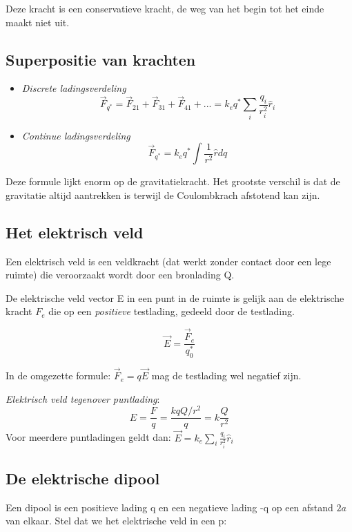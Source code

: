 \documentclass[12pt,a4paper]{article}
\begin{document}
	Deze kracht is een conservatieve kracht, de weg van het begin tot het einde maakt niet uit. 
	\newline
	
	\subsection{Superpositie van krachten}
	\begin{itemize}
		\item \textit{Discrete ladingsverdeling} 
		\[\vec{F}_{q^*} = \vec{F}_{21} + \vec{F}_{31} + \vec{F}_{41} + ... = k_eq^*\sum_i \frac{q_i}{r_i^2}\hat{r}_i\]
		\item \textit{Continue ladingsverdeling}
		\[\vec{F}_{q^*} = k_eq^* \int\frac{1}{r^2}\hat{r}dq\]
	\end{itemize}
    Deze formule lijkt enorm op de gravitatiekracht. Het grootste verschil is dat de gravitatie altijd aantrekken is terwijl de Coulombkrach afstotend kan zijn.
    
    \subsection{Het elektrisch veld}
    Een elektrisch veld is een veldkracht (dat werkt zonder contact door een lege ruimte) die veroorzaakt wordt door een bronlading Q.
    
    De elektrische veld vector E in een punt in de ruimte is gelijk aan de elektrische kracht $F_e$ die op een \textit{positieve} testlading, gedeeld door de testlading.
    
    \[\vec{E} = \frac{\vec{F}_e}{q_0^*}\]
    
    In de omgezette formule: \(\vec{F}_e = q\vec{E}\) mag de testlading wel negatief zijn. 
    
    \textit{Elektrisch veld tegenover puntlading}:
    \[E = \frac{F}{q} = \frac{kqQ/r^2}{q} = k\frac{Q}{r^2}\]
    Voor meerdere puntladingen geldt dan: \(\vec{E} = k_e \sum_i \frac{q_i}{r_i^2}\hat{r}_i\)
    
    \subsection{De elektrische dipool}
    Een dipool is een positieve lading q en een negatieve lading -q op een afstand $2a$ van elkaar. Stel dat we het elektrische
    veld in een p:
\end{document}
